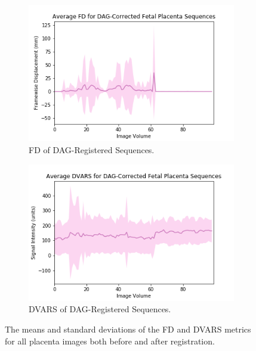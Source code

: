 \begin{figure}[t]
	\begin{subfigure}{0.4\textwidth}
		\centering
		\includegraphics[width=1.0\textwidth]{6/figures/fetal-placenta-dag-fd-150.png}
		\caption{FD of DAG-Registered Sequences.}
	\end{subfigure}
	\hspace{0.05\textwidth}
	\begin{subfigure}{0.4\textwidth}
		\centering
		\includegraphics[width=1.0\textwidth]{6/figures/fetal-placenta-dag-dvars-150.png}
		\caption{DVARS of DAG-Registered Sequences.}
	\end{subfigure}
\caption{The means and standard deviations of the FD and DVARS metrics for all placenta images both before and after registration.}
\label{fig:fetal-placenta-power-dists}
\end{figure}

